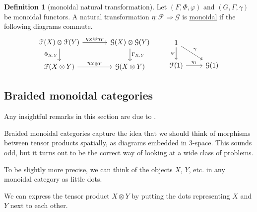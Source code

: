 \documentclass[a4paper]{report}
\newcommand{\defn}[1]{\ul{#1}}
\theoremstyle{definition}
\newtheorem{definition}{Definition}[section]
\theoremstyle{plain}
\theoremstyle{remark}
\begin{document}
\begin{definition}[monoidal natural transformation]
  \label{def:monoidalnaturatransformation}
  Let $(F, \Phi, \varphi)$ and $(G, \Gamma, \gamma)$ be monoidal functors. A natural transformation $\eta: \mathcal{F} \Rightarrow \mathcal{G}$ is \defn{monoidal} if the following diagrams commute.
  \begin{equation*}
    \begin{tikzcd}[column sep=large]
      \mathcal{F}(X) \otimes \mathcal{F}(Y) 
      \arrow[r, "\eta_{X} \otimes \eta_{Y}"]
      \arrow[d, swap, "{\Phi_{X, Y}}"]
      & \mathcal{G}(X) \otimes \mathcal{G}(Y)
      \arrow[d, "{\Gamma_{X, Y}}"]
      \\
      \mathcal{F}(X \otimes Y)
      \arrow[r, "\eta_{X \otimes Y}"]
      & \mathcal{G}(X \otimes Y)
    \end{tikzcd}
    \qquad
    \begin{tikzcd}
      1
      \arrow[d, swap, "\varphi"]
      \arrow[dr, "\gamma"]
      \\
      \mathcal{F}(1)
      \arrow[r, "\eta_{1}"]
      & \mathcal{G}(1)
    \end{tikzcd}
  \end{equation*}
\end{definition}

\subsection{Braided monoidal categories}
Any insightful remarks in this section are due to \cite{baez-this-weeks-finds-137}.

Braided monoidal categories capture the idea that we should think of morphisms between tensor products spatially, as diagrams embedded in 3-space. This sounds odd, but it turns out to be the correct way of looking at a wide class of problems. 

To be slightly more precise, we can think of the objects $X$, $Y$, etc. in any monoidal category as little dots.
\begin{center}
\end{center}

We can express the tensor product $X \otimes Y$ by putting the dots representing $X$ and $Y$ next to each other.
\begin{center}
\end{center}
\end{document}
